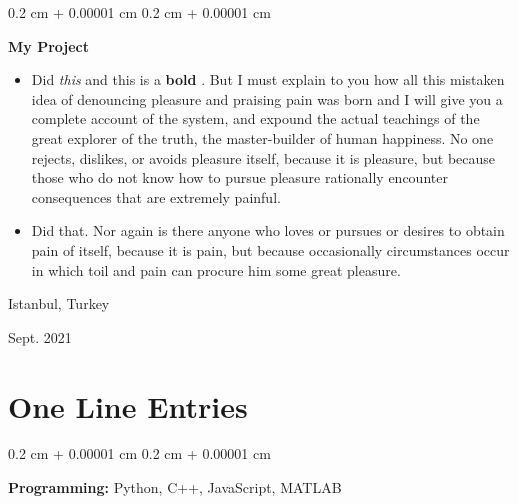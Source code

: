 \documentclass[10pt, letterpaper]{article}
\newenvironment{highlights}{
    \begin{itemize}[
        topsep=0.10 cm,
        parsep=0.10 cm,
        partopsep=0pt,
        itemsep=0pt,
        leftmargin=0.4 cm + 10pt
    ]
}{
    \end{itemize}
} %
\newenvironment{onecolentry}{
    \begin{adjustwidth}{
        0.2 cm + 0.00001 cm
    }{
        0.2 cm + 0.00001 cm
    }
}{
    \end{adjustwidth}
} %
\newenvironment{twocolentry}[2][]{
    \onecolentry
    \def\secondColumn{#2}
    \setcolumnwidth{\fill, 4.5 cm}
    \begin{paracol}{2}
}{
    \switchcolumn \raggedleft \secondColumn
    \end{paracol}
    \endonecolentry
} %
\let\hrefWithoutArrow\href
\renewcommand{\href}[2]{\hrefWithoutArrow{#1}{\mbox{\ifthenelse{\equal{#2}{}}{ }{#2 }\raisebox{.15ex}{\footnotesize \faExternalLink*}}}}
\begin{document}
        \vspace{0.2 cm}

        \begin{twocolentry}{
            Istanbul, Turkey

        Sept. 2021
        }
            \textbf{My Project}
            \begin{highlights}
                \item Did \textit{this} and this is a \textbf{bold} \href{https://example.com}{link}. But I must explain to you how all this mistaken idea of denouncing pleasure and praising pain was born and I will give you a complete account of the system, and expound the actual teachings of the great explorer of the truth, the master-builder of human happiness. No one rejects, dislikes, or avoids pleasure itself, because it is pleasure, but because those who do not know how to pursue pleasure rationally encounter consequences that are extremely painful.
                \item Did that. Nor again is there anyone who loves or pursues or desires to obtain pain of itself, because it is pain, but because occasionally circumstances occur in which toil and pain can procure him some great pleasure.
            \end{highlights}
        \end{twocolentry}



    
    \section{One Line Entries}

        
        \begin{onecolentry}
            \textbf{Pro\textnormal{gram}ming:} Python, C++, JavaScript, MATLAB
        \end{onecolentry}


    
\end{document}
